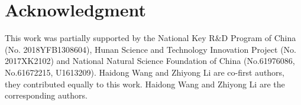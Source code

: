 \documentclass[journal]{IEEEtran}
\begin{document}
\section*{Acknowledgment}
This work was partially supported by the National Key R$\&$D Program of China (No. 2018YFB1308604), Hunan Science and Technology Innovation Project (No. 2017XK2102) and National Natural Science Foundation of China (No.61976086, No.61672215, U1613209). Haidong Wang and Zhiyong Li are co-first authors, they contributed equally to this work. Haidong Wang and Zhiyong Li are the corresponding authors. 














\ifCLASSOPTIONcaptionsoff
  \newpage
\fi





%
%
%
\end{document}
